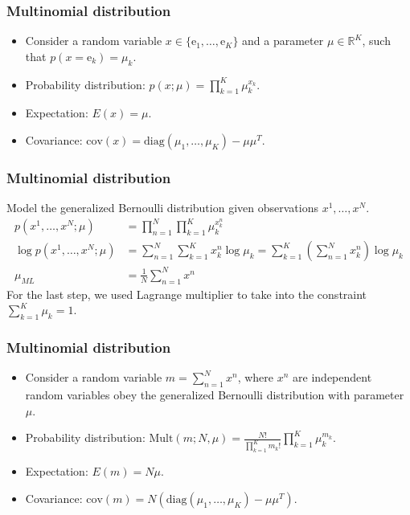 \documentclass{beamer}
\begin{document}
\begin{frame}
    \frametitle{Multinomial distribution}
    \begin{itemize}
        \item Consider a random variable $x\in\{\mathrm{e}_{1},\hdots,\mathrm{e}_{K}\}$ and a parameter $\mu\in\mathbb{R}^{K}$, such that $p(x=\mathrm{e}_{k})=\mu_{k}$.
        \item Probability distribution: $p(x;\mu)=\prod_{k=1}^{K}\mu_{k}^{x_{k}}$.
        \item Expectation: $E(x)=\mu$.
        \item Covariance: $\mathrm{cov}(x)=\mathrm{diag}(\mu_{1},\hdots,\mu_{K})-\mu\mu^{T}$.
    \end{itemize}
\end{frame}

\begin{frame}
    \frametitle{Multinomial distribution}
    Model the generalized Bernoulli distribution given observations $x^{1},\hdots,x^{N}$.
    \begin{align*}
        p(x^{1},\hdots,x^{N};\mu)&=\prod_{n=1}^{N}\prod_{k=1}^{K}\mu_{k}^{x^{n}_{k}} \\
        \log{}p(x^{1},\hdots,x^{N};\mu)&=\sum_{n=1}^{N}\sum_{k=1}^{K}x^{n}_{k}\log\mu_{k}=\sum_{k=1}^{K}(\sum_{n=1}^{N}x^{n}_{k})\log\mu_{k} \\
        \mu_{ML}&=\frac{1}{N}\sum_{n=1}^{N}x^{n}
    \end{align*}
    For the last step, we used Lagrange multiplier to take into the constraint $\sum_{k=1}^{K}\mu_{k}=1$.
\end{frame}

\begin{frame}
    \frametitle{Multinomial distribution}
    \begin{itemize}
        \item Consider a random variable $m=\sum_{n=1}^{N}x^{n}$, where $x^{n}$ are independent random variables obey the generalized Bernoulli distribution with parameter $\mu$.
        \item Probability distribution: $\mathrm{Mult}(m;N,\mu)=\frac{N!}{\prod_{k=1}^{K}m_{k}!}\prod_{k=1}^{K}\mu_{k}^{m_{k}}$.
        \item Expectation: $E(m)=N\mu$.
        \item Covariance: $\mathrm{cov}(m)=N(\mathrm{diag}(\mu_{1},\hdots,\mu_{K})-\mu\mu^{T})$.
    \end{itemize}
\end{frame}
\end{document}
